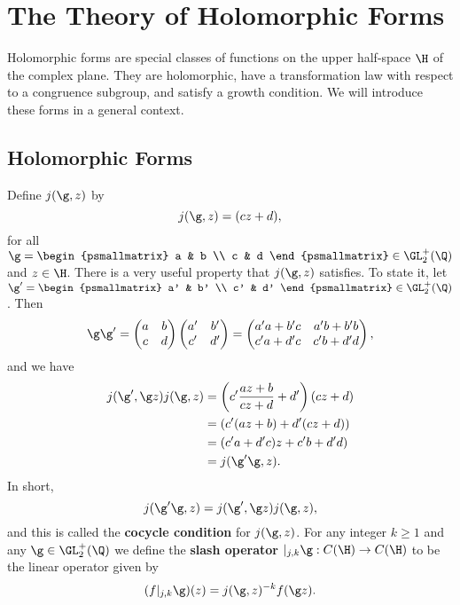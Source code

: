 \chapter{The Theory of Holomorphic Forms}
  Holomorphic forms are special classes of functions on the upper half-space $\H$ of the complex plane. They are holomorphic, have a transformation law with respect to a congruence subgroup, and satisfy a growth condition. We will introduce these forms in a general context.
  \section{Holomorphic Forms}
    Define $j(\g,z)$ by
    \[
      j(\g,z) = (cz+d),
    \]
    for all $\g = \begin{psmallmatrix} a & b \\ c & d \end{psmallmatrix} \in \GL_{2}^{+}(\Q)$ and $z \in \H$. There is a very useful property that $j(\g,z)$ satisfies. To state it, let $\g' = \begin{psmallmatrix} a' & b' \\ c' & d' \end{psmallmatrix} \in \GL_{2}^{+}(\Q)$. Then
    \[
      \g\g' = \begin{pmatrix} a & b \\ c & d \end{pmatrix}\begin{pmatrix} a' & b' \\ c' & d' \end{pmatrix} = \begin{pmatrix} a'a+b'c & a'b+b'b \\ c'a+d'c & c'b+d'd \end{pmatrix},
    \]
    and we have
    \begin{align*}
      j(\g',\g z)j(\g,z) &= \left(c'\frac{az+b}{cz+d}+d'\right)(cz+d) \\
      &= (c'(az+b)+d'(cz+d)) \\
      &= (c'a+d'c)z+c'b+d'd) \\
      &= j(\g'\g,z).
    \end{align*}
    In short,
    \[
      j(\g'\g,z) =  j(\g',\g z)j(\g,z),
    \]
    and this is called the \textbf{cocycle condition} for $j(\g,z)$. For any integer $k \ge 1$ and any $\g \in \GL_{2}^{+}(\Q)$ we define the \textbf{slash operator} $|_{j,k}\g:C(\H) \to C(\H)$ to be the linear operator given by
    \[
      (f|_{j,k}\g)(z) = j(\g,z)^{-k}f(\g z).
    \]

